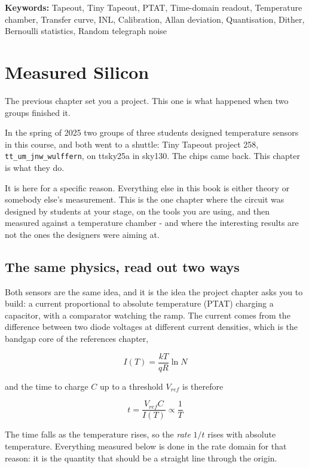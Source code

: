 \textbf{Keywords:} Tapeout, Tiny Tapeout, PTAT, Time-domain readout,
Temperature chamber, Transfer curve, INL, Calibration, Allan deviation,
Quantisation, Dither, Bernoulli statistics, Random telegraph noise

\section{Measured Silicon}\label{measured-silicon}

The previous chapter set you a project. This one is what happened when
two groups finished it.

In the spring of 2025 two groups of three students designed temperature
sensors in this course, and both went to a shuttle: Tiny Tapeout project
258, \texttt{tt\_um\_jnw\_wulffern}, on ttsky25a in sky130. The chips
came back. This chapter is what they do.

It is here for a specific reason. Everything else in this book is either
theory or somebody else's measurement. This is the one chapter where the
circuit was designed by students at your stage, on the tools you are
using, and then measured against a temperature chamber - and where the
interesting results are not the ones the designers were aiming at.

\subsection{The same physics, read out two
ways}\label{the-same-physics-read-out-two-ways}

Both sensors are the same idea, and it is the idea the project chapter
asks you to build: a current proportional to absolute temperature (PTAT)
charging a capacitor, with a comparator watching the ramp. The current
comes from the difference between two diode voltages at different
current densities, which is the bandgap core of the references chapter,

\[I(T) = \frac{kT}{qR}\ln N\]

and the time to charge \(C\) up to a threshold \(V_{ref}\) is therefore

\[t = \frac{V_{ref}C}{I(T)} \propto \frac{1}{T}\]

The time falls as the temperature rises, so the \emph{rate} \(1/t\)
rises with absolute temperature. Everything measured below is done in
the rate domain for that reason: it is the quantity that should be a
straight line through the origin.

